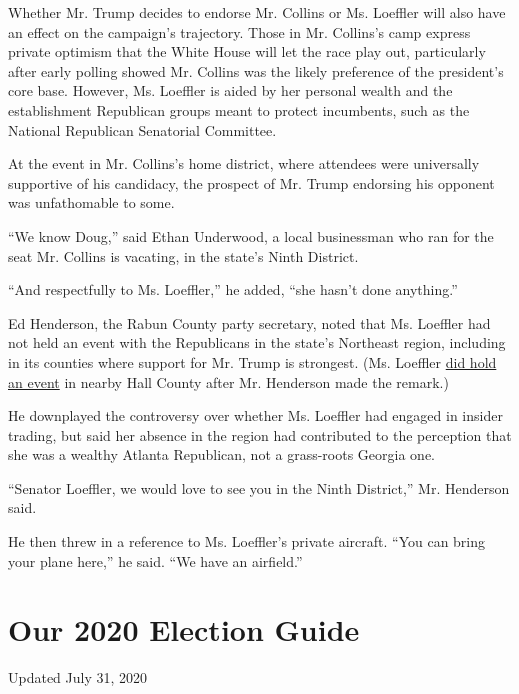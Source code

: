 Whether Mr. Trump decides to endorse Mr. Collins or Ms. Loeffler will
also have an effect on the campaign's trajectory. Those in Mr. Collins's
camp express private optimism that the White House will let the race
play out, particularly after early polling showed Mr. Collins was the
likely preference of the president's core base. However, Ms. Loeffler is
aided by her personal wealth and the establishment Republican groups
meant to protect incumbents, such as the National Republican Senatorial
Committee.

At the event in Mr. Collins's home district, where attendees were
universally supportive of his candidacy, the prospect of Mr. Trump
endorsing his opponent was unfathomable to some.

``We know Doug,'' said Ethan Underwood, a local businessman who ran for
the seat Mr. Collins is vacating, in the state's Ninth District.

``And respectfully to Ms. Loeffler,'' he added, ``she hasn't done
anything.''

Ed Henderson, the Rabun County party secretary, noted that Ms. Loeffler
had not held an event with the Republicans in the state's Northeast
region, including in its counties where support for Mr. Trump is
strongest. (Ms. Loeffler
\href{https://www.ajc.com/blog/politics/dangerous-loeffler-goes-collins-hometown-slam-his-big-tech-stance/zZJNxGWhE1tNjec7v7TSQJ/}{did
hold an event} in nearby Hall County after Mr. Henderson made the
remark.)

He downplayed the controversy over whether Ms. Loeffler had engaged in
insider trading, but said her absence in the region had contributed to
the perception that she was a wealthy Atlanta Republican, not a
grass-roots Georgia one.

``Senator Loeffler, we would love to see you in the Ninth District,''
Mr. Henderson said.

He then threw in a reference to Ms. Loeffler's private aircraft. ``You
can bring your plane here,'' he said. ``We have an airfield.''

\hypertarget{our-2020-election-guide}{%
\section{Our 2020 Election Guide}\label{our-2020-election-guide}}

Updated July 31, 2020

